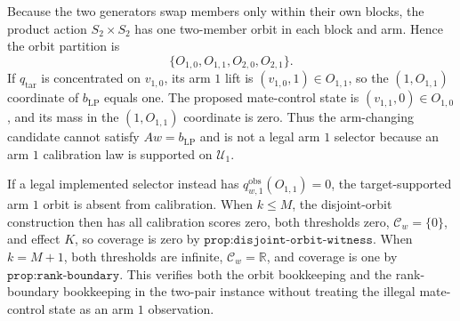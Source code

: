 Because the two generators swap members only within their own blocks, the product action \(S_2\times S_2\) has one two-member orbit in each block and arm. Hence the orbit partition is \[\{O_{1,0},O_{1,1},O_{2,0},O_{2,1}\}.\] If \(q_{\mathrm{tar}}\) is concentrated on \(v_{1,0}\), its arm \(1\) lift is \((v_{1,0},1)\in O_{1,1}\), so the \((1,O_{1,1})\) coordinate of \(b_{\mathrm{LP}}\) equals one. The proposed mate-control state is \((v_{1,1},0)\in O_{1,0}\), and its mass in the \((1,O_{1,1})\) coordinate is zero. Thus the arm-changing candidate cannot satisfy \(Aw=b_{\mathrm{LP}}\) and is not a legal arm \(1\) selector because an arm \(1\) calibration law is supported on \(\mathcal U_1\).

If a legal implemented selector instead has \(q^{\mathrm{obs}}_{w,1}(O_{1,1})=0\), the target-supported arm \(1\) orbit is absent from calibration. When \(k\le M\), the disjoint-orbit construction then has all calibration scores zero, both thresholds zero, \(\mathcal C_w=\{0\}\), and effect \(K\), so coverage is zero by \(\texttt{prop:disjoint-orbit-witness}\). When \(k=M+1\), both thresholds are infinite, \(\mathcal C_w=\mathbb R\), and coverage is one by \(\texttt{prop:rank-boundary}\). This verifies both the orbit bookkeeping and the rank-boundary bookkeeping in the two-pair instance without treating the illegal mate-control state as an arm \(1\) observation.